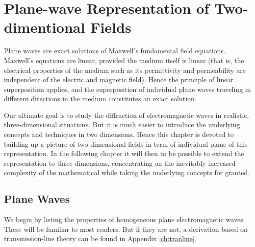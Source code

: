 \chapter{Plane-wave Representation of Two-dimentional Fields}
\label{ch:pw2d}
Plane waves are exact solutions of Maxwell's fundamental field equations. Maxwell's equations are linear, provided the medium itself is linear (that is, the electrical properties of the medium such as its permittivity and permeability are independent of the electric and magnetic field). Hence the principle of linear superposition applies, and the superposition of individual plane waves traveling in different directions in the medium constitutes an exact solution.

Our ultimate goal is to study the diffraction of electromagnetic waves in realistic, three-dimensional situations. But it is much easier to introduce the underlying concepts and techniques in two dimensions. Hence this chapter is devoted to building up a picture of two-dimensional fields in term of individual plane of this representation. In the following chapter it will then to be possible to extend the representation to three dimensions, concentrating on the inevitably increased complexity of the mathematical while taking the underlying concepts for granted.

\section{Plane Waves}
\label{sec:plwa}
We begin by listing the properties of homogeneous plane electromagnetic waves. These will be familiar to most readers. But if they are not, a derivation based on transmission-line theory can be found in Appendix \ref{ch:tranline}.

